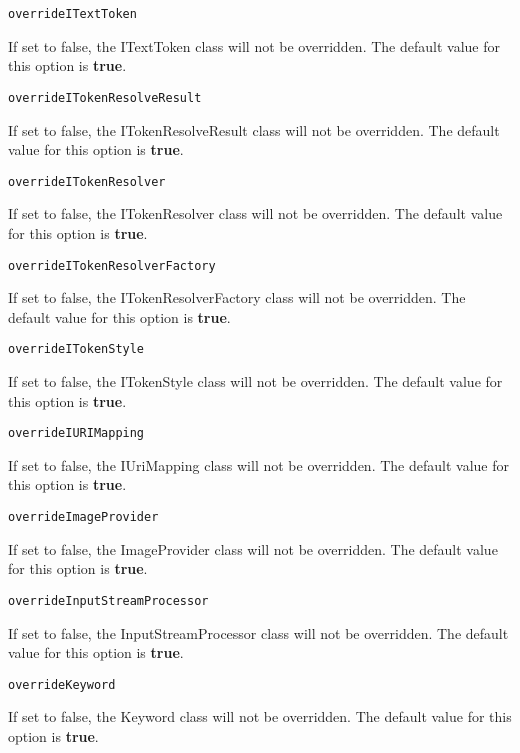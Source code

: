 \noindent\texttt{overrideITextToken}
\begin{myindentpar}{1cm}
If set to false, the ITextToken class will not be overridden. The default value for this option is \textbf{true}.
\end{myindentpar}

\noindent\texttt{overrideITokenResolveResult}
\begin{myindentpar}{1cm}
If set to false, the ITokenResolveResult class will not be overridden. The default value for this option is \textbf{true}.
\end{myindentpar}

\noindent\texttt{overrideITokenResolver}
\begin{myindentpar}{1cm}
If set to false, the ITokenResolver class will not be overridden. The default value for this option is \textbf{true}.
\end{myindentpar}

\noindent\texttt{overrideITokenResolverFactory}
\begin{myindentpar}{1cm}
If set to false, the ITokenResolverFactory class will not be overridden. The default value for this option is \textbf{true}.
\end{myindentpar}

\noindent\texttt{overrideITokenStyle}
\begin{myindentpar}{1cm}
If set to false, the ITokenStyle class will not be overridden. The default value for this option is \textbf{true}.
\end{myindentpar}

\noindent\texttt{overrideIURIMapping}
\begin{myindentpar}{1cm}
If set to false, the IUriMapping class will not be overridden. The default value for this option is \textbf{true}.
\end{myindentpar}

\noindent\texttt{overrideImageProvider}
\begin{myindentpar}{1cm}
If set to false, the ImageProvider class will not be overridden. The default value for this option is \textbf{true}.
\end{myindentpar}

\noindent\texttt{overrideInputStreamProcessor}
\begin{myindentpar}{1cm}
If set to false, the InputStreamProcessor class will not be overridden. The default value for this option is \textbf{true}.
\end{myindentpar}

\noindent\texttt{overrideKeyword}
\begin{myindentpar}{1cm}
If set to false, the Keyword class will not be overridden. The default value for this option is \textbf{true}.
\end{myindentpar}

